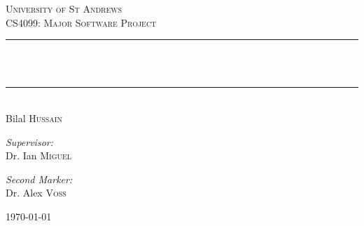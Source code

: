 
\begin{titlepage}

\begin{center}



\textsc{\LARGE University of St Andrews}\\[10pt]
\textsc{\large CS4099: Major Software Project}\\[2cm]


\newcommand{\HRule}{\rule{9cm}{0.5mm}}

\HRule\\[10pt]
{ \Huge \bfseries \theTitle }\\
\HRule\\[20pt]
{ \LARGE Bilal \textsc{Hussain}}
\vspace{1.5cm}

\begin{minipage}{0.4\textwidth}
\begin{flushleft} \large
\emph{Supervisor:} \\
Dr. Ian  \textsc{Miguel}
\end{flushleft}
\end{minipage}
\begin{minipage}{0.4\textwidth}
\begin{flushright} \large
\emph{Second Marker:} \\
Dr. Alex \textsc{Voss}
\end{flushright}
\end{minipage}

\vfill

{\large \today}
\end{center}
\end{titlepage}
